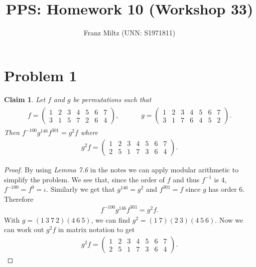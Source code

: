 \documentclass{article}
\title{PPS: Homework 10 (Workshop 33)}
\author{Franz Miltz (UNN: S1971811)}
\newtheorem{claim}[section]{Claim}
\begin{document}
\maketitle
\section*{Problem 1}
\begin{claim}
  Let $f$ and $g$ be permutations such that
  \begin{align*}
    \begin{aligned}
    f = \begin{pmatrix}
      1&2&3&4&5&6&7\\
      3&1&5&7&2&6&4
    \end{pmatrix},
    \end{aligned}
    \hspace{1cm}
    \begin{aligned}
    g = \begin{pmatrix}
      1&2&3&4&5&6&7\\
      3&1&7&6&4&5&2
    \end{pmatrix}.
    \end{aligned}
  \end{align*}
  Then $f^{-100}g^{146}f^{301}=g^2f$ where
  \begin{align*}
    g^2f=\begin{pmatrix}
      1&2&3&4&5&6&7\\
      2&5&1&7&3&6&4
    \end{pmatrix}.
  \end{align*}
\end{claim}
\begin{proof}
  By using \emph{Lemma 7.6} in the notes we can apply modular arithmetic to simplify the problem. 
  We see that, since the order of $f$ and thus $f^{-1}$ is $4$, $f^{-100} = f^{0} = \iota$.
  Similarly we get that $g^{146}=g^2$ and $f^{301}=f$ since $g$ has order $6$. Therefore
  \begin{align*}
    f^{-100}g^{146}f^{301}=g^2f.
  \end{align*}
  With $g=(1\:3\:7\:2)(4\:6\:5)$, we can find $g^2=(1\:7)(2\:3)(4\:5\:6)$. Now we can work out $g^2f$ in matrix notation to get
  \begin{align*}
    g^2f=\begin{pmatrix}
      1&2&3&4&5&6&7\\
      2&5&1&7&3&6&4
    \end{pmatrix}.
  \end{align*}
\end{proof}
\end{document}

